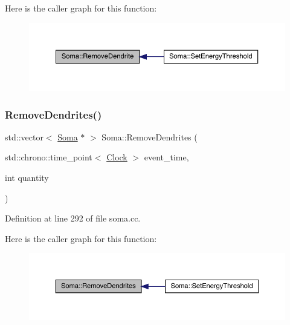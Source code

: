 Here is the caller graph for this function\+:
\nopagebreak
\begin{figure}[H]
\begin{center}
\leavevmode
\includegraphics[width=350pt]{class_soma_a85c7d4b41486182c9528f5c43beaf7fd_icgraph}
\end{center}
\end{figure}
\mbox{\label{class_soma_ad15baed4b2f5dab6f93e5df8fd1f7b23}} 
\subsubsection{\texorpdfstring{Remove\+Dendrites()}{RemoveDendrites()}}
{\footnotesize\ttfamily std\+::vector$<$ \hyperlink{class_soma}{Soma} $\ast$ $>$ Soma\+::\+Remove\+Dendrites (\begin{DoxyParamCaption}\item[{std\+::chrono\+::time\+\_\+point$<$ \hyperlink{universe_8h_a0ef8d951d1ca5ab3cfaf7ab4c7a6fd80}{Clock} $>$}]{event\+\_\+time,  }\item[{int}]{quantity }\end{DoxyParamCaption})}



Definition at line 292 of file soma.\+cc.

Here is the caller graph for this function\+:
\nopagebreak
\begin{figure}[H]
\begin{center}
\leavevmode
\includegraphics[width=350pt]{class_soma_ad15baed4b2f5dab6f93e5df8fd1f7b23_icgraph}
\end{center}
\end{figure}
\mbox{\label{class_soma_a82f016dc126f7d1053e5eb455d28c44b}} 
